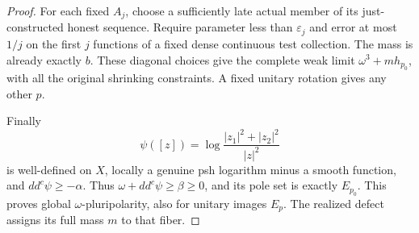 \documentclass[11pt]{article}
\newcommand{\ddc}{dd^c}
\begin{document}
\begin{proof}
For each fixed $A_j$, choose a sufficiently late actual member of
its just-constructed honest sequence. Require parameter less than
$\varepsilon_j$ and error at most $1/j$ on the first $j$ functions
of a fixed dense continuous test collection. The mass is already
exactly $b$. These diagonal choices give the complete weak limit
$\omega^3+mh_{p_0}$, with all the original shrinking constraints.
A fixed unitary rotation gives any other $p$.

Finally
\[
 \psi([z])=\log\frac{|z_1|^2+|z_2|^2}{|z|^2}
\]
is well-defined on $X$, locally a genuine psh logarithm minus a
smooth function, and $\ddc\psi\geq-\alpha$.
Thus $\omega+\ddc\psi\geq\beta\geq0$, and its pole set is exactly
$E_{p_0}$. This proves global $\omega$-pluripolarity, also for
unitary images $E_p$. The realized defect assigns its full mass
$m$ to that fiber.
\end{proof}
\end{document}
